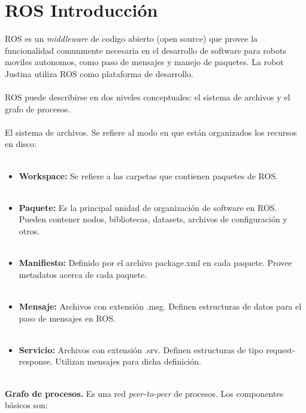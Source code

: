 \documentclass[a4paper,usenames,dvipsnames,svgnames,table]{book}
\begin{document}
\section{ROS Introducción}
ROS es un \textit{middleware} de codigo abierto (open source) que provee la funcionalidad comunmente necesaria en el desarrollo de software para robots moviles autonomos, como paso de mensajes y manejo de paquetes. La robot Justina utiliza ROS como plataforma de desarrollo.\\
\\
ROS puede describirse en dos niveles conceptuales: el sistema de archivos y el grafo de
procesos.\\
\\
El sistema de archivos. Se refiere al modo en que están organizados los recursos en
disco:\\
\\
\begin{itemize}
\item \textbf{Workspace:} Se refiere a las carpetas que contienen paquetes de ROS.\\
\\
\item \textbf{Paquete:} Es la principal unidad de organización de software en ROS. Pueden contener nodos, bibliotecas, datasets, archivos de configuración y otros.\\
\\
\item \textbf{Manifiesto:} Definido por el archivo package.xml en cada paquete. Provee metadatos acerca de cada paquete.\\
\\
\item \textbf{Mensaje:} Archivos con extensión .msg. Definen estructuras de datos para el paso de mensajes en ROS.\\
\\
\item \textbf{Servicio:} Archivos con extensión .srv. Definen estructuras de tipo request-response. Utilizan mensajes para dicha definición.\\
\\
\end{itemize}
\textbf{Grafo de procesos.} Es una red \textit{peer-to-peer} de procesos. Los componentes básicos son:\\
\\
\end{document}
